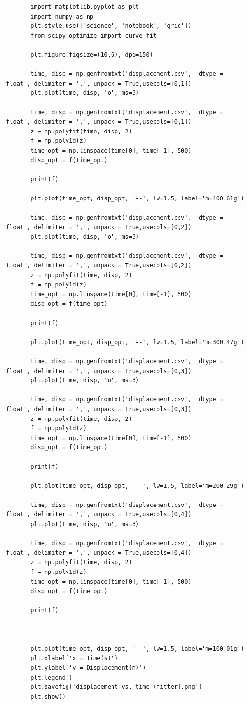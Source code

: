\documentclass{article}
\begin{document}
 	\begin{lstlisting}
 		import matplotlib.pyplot as plt
 		import numpy as np
 		plt.style.use(['science', 'notebook', 'grid'])
 		from scipy.optimize import curve_fit
 		
 		plt.figure(figsize=(10,6), dpi=150)
 		
 		time, disp = np.genfromtxt('displacement.csv',  dtype = 'float', delimiter = ',', unpack = True,usecols=[0,1])
 		plt.plot(time, disp, 'o', ms=3)
 		
 		time, disp = np.genfromtxt('displacement.csv',  dtype = 'float', delimiter = ',', unpack = True,usecols=[0,1])
 		z = np.polyfit(time, disp, 2)
 		f = np.poly1d(z)
 		time_opt = np.linspace(time[0], time[-1], 500)
 		disp_opt = f(time_opt)
 		
 		print(f)
 		
 		plt.plot(time_opt, disp_opt, '--', lw=1.5, label='m=400.61g')
 		
 		time, disp = np.genfromtxt('displacement.csv',  dtype = 'float', delimiter = ',', unpack = True,usecols=[0,2])
 		plt.plot(time, disp, 'o', ms=3)
 		
 		time, disp = np.genfromtxt('displacement.csv',  dtype = 'float', delimiter = ',', unpack = True,usecols=[0,2])
 		z = np.polyfit(time, disp, 2)
 		f = np.poly1d(z)
 		time_opt = np.linspace(time[0], time[-1], 500)
 		disp_opt = f(time_opt)
 		
 		print(f)
 		
 		plt.plot(time_opt, disp_opt, '--', lw=1.5, label='m=300.47g')
 		
 		time, disp = np.genfromtxt('displacement.csv',  dtype = 'float', delimiter = ',', unpack = True,usecols=[0,3])
 		plt.plot(time, disp, 'o', ms=3)
 		
 		time, disp = np.genfromtxt('displacement.csv',  dtype = 'float', delimiter = ',', unpack = True,usecols=[0,3])
 		z = np.polyfit(time, disp, 2)
 		f = np.poly1d(z)
 		time_opt = np.linspace(time[0], time[-1], 500)
 		disp_opt = f(time_opt)
 		
 		print(f)
 		
 		plt.plot(time_opt, disp_opt, '--', lw=1.5, label='m=200.29g')
 		
 		time, disp = np.genfromtxt('displacement.csv',  dtype = 'float', delimiter = ',', unpack = True,usecols=[0,4])
 		plt.plot(time, disp, 'o', ms=3)
 		
 		time, disp = np.genfromtxt('displacement.csv',  dtype = 'float', delimiter = ',', unpack = True,usecols=[0,4])
 		z = np.polyfit(time, disp, 2)
 		f = np.poly1d(z)
 		time_opt = np.linspace(time[0], time[-1], 500)
 		disp_opt = f(time_opt)
 		
 		print(f)
 		
 		
 		
 		plt.plot(time_opt, disp_opt, '--', lw=1.5, label='m=100.01g')
 		plt.xlabel('x = Time(s)')
 		plt.ylabel('y = Displacement(m)')
 		plt.legend()
 		plt.savefig('displacement vs. time (fitter).png')
 		plt.show()
 	\end{lstlisting}
 
\end{document}
